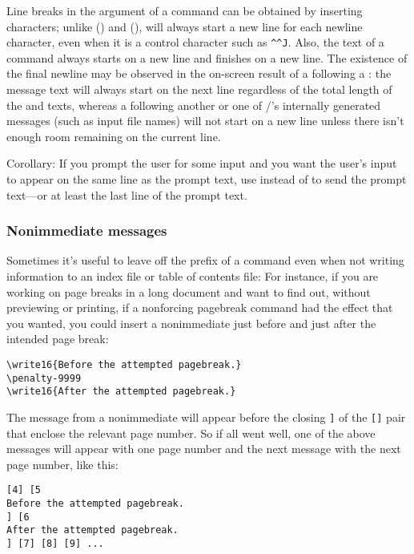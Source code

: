 {Line breaks in the argument of a  command can be obtained by
inserting  characters; unlike 
() and  (),
 will always start a new line for each newline character,
even when it is a control character such as \verb|^^J|. Also, the text
of a  command always starts on a new line and finishes on a
new line. The existence of the final newline may be observed in the
on-screen result of a  following a : the message
text will always start on the next line regardless of the total length
of the  and  texts, whereas a 
following another  or one of \tex/'s internally generated
messages (such as input file names) will not start on a new line
unless there isn't enough room remaining on the current line.

Corollary: If you prompt the user for some input and you want the
user's input to appear on the same line as the prompt text, use
 instead of  to send the prompt text---or at
least the last line of the prompt text.

\subsubsection{Nonimmediate  messages}
Sometimes it's useful to leave off
the  prefix of a  command
even when not writing information to an index file or
table of contents file:  For instance, if you are working on page breaks in
a long document and want to find out, without previewing or printing,
if a nonforcing pagebreak command had the effect that you wanted, you
could insert a nonimmediate  just before and just after the
intended page break:
 \begin{verbatim}
\write16{Before the attempted pagebreak.}
\penalty-9999
\write16{After the attempted pagebreak.}
\end{verbatim}
 The message from a nonimmediate  will appear before the
closing \verb|]| of the \verb|[|\thinspace\nobreak\verb|]| pair that enclose the relevant
page number.  So if all went well, one of the above messages will
appear with one page number and the next message with the
next page number, like this:
 \begin{verbatim}
[4] [5
Before the attempted pagebreak.
] [6
After the attempted pagebreak.
] [7] [8] [9] ...
\end{verbatim}

}
